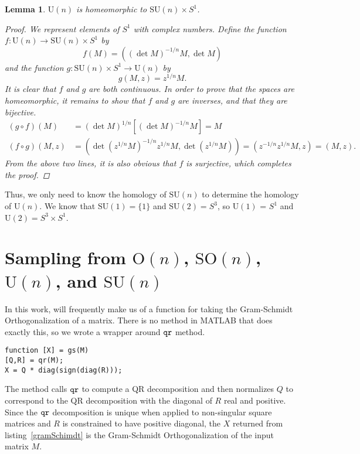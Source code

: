 \documentclass[letterpaper,11pt]{article}
\newtheorem{lemma}{Lemma}
\newcommand{\MG}[2]{{\text{#1}(#2)}}
\newcommand{\Un}{\MG{U}{n}}
\newcommand{\On}{\MG{O}{n}}
\newcommand{\SUn}{\MG{SU}{n}}
\newcommand{\SOn}{\MG{SO}{n}}
\begin{document}
\begin{lemma}
$\Un$ is homeomorphic to $\SUn\times S^1$.

\begin{proof}
We represent elements of $S^1$ with complex numbers.
Define the function $f: \Un \to \SUn\times S^1$ by
\[
  f(M) = \left( (\det M)^{-1/n}M, \det M \right)
\]
and the function $g: \SUn\times S^1 \to \Un$ by
\[
  g(M,z) = z^{1/n}M.
\]
It is clear that $f$ and $g$ are both continuous.
In order to prove that the spaces are homeomorphic, it remains to show that $f$ and $g$ are inverses, and that they are bijective.
\begin{align}
  (g \circ f)(M) &= \left( \det M \right)^{1/n} \left[\left( \det M \right)^{-1/n}M\right] = M\\
  (f \circ g)(M, z) &= \left(\det\left(z^{1/n}M\right)^{-1/n}z^{1/n}M, \det\left(z^{1/n}M\right)\right)
                     = \left(z^{-1/n}z^{1/n}M, z\right) = (M, z).
\end{align}
From the above two lines, it is also obvious that $f$ is surjective, which completes the proof.
\end{proof}
\end{lemma}
Thus, we only need to know the homology of $\SUn$ to determine the homology of $\Un$.
We know that $\MG{SU}{1} = \{1\}$ and $\MG{SU}{2} = S^3$, so $\MG{U}{1}$ = $S^1$ and $\MG{U}{2} = S^3\times S^1$.

\section{Sampling from $\On$, $\SOn$, $\Un$, and $\SUn$}

In this work, will frequently make us of a function for taking the Gram-Schmidt Orthogonalization of a matrix.
  There is no method in MATLAB that does exactly this, so we wrote a wrapper around $\tt{qr}$ method.

\begin{lstlisting}[label=gramSchimdt,caption=Computing the Gram-Schmidt Orthogonalization of a input matrix.]
function [X] = gs(M)
[Q,R] = qr(M);
X = Q * diag(sign(diag(R)));
\end{lstlisting}

The method calls $\tt{qr}$ to compute a QR decomposition and then normalizes $Q$ to correspond to the
  QR decomposition with the diagonal of $R$ real and positive. Since the $\tt{qr}$ decomposition is
  unique when applied to non-singular square matrices and $R$ is constrained to have positive
  diagonal, the $X$ returned from listing~\ref{gramSchimdt} is the Gram-Schmidt Orthogonalization
  of the input matrix $M$.
\end{document}
